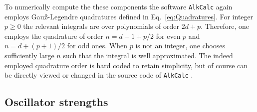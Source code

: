 \documentclass[fontsize=12pt,
               twoside=false,
               BCOR=0mm,
               DIV=14,
               overfullrule=false, %
               toc=bibliography,
               headinclude=true,
               footinclude=false]{scrartcl}
\numberwithin{equation}{section}
\newcommand{\alkcalc}{\texttt{AlkCalc} }
\begin{document}
    To numerically compute the these components the software \alkcalc again
    employs Gau\ss-Legendre quadratures defined in Eq.~\eqref{eq:Quadratures}.
    For integer $p\geq0$ the relevant integrals are over polynomials of order
    $2d+p$. Therefore, one employs the quadrature of order $n=d+1+p\slash{2}$
    for even $p$ and $n=d+(p+1)\slash{2}$ for odd ones. When $p$ is not an
    integer, one chooses sufficiently large $n$ such that the integral is well
    approximated.  The indeed employed quadrature order is hard coded to retain
    simplicity, but of course can be directly viewed or changed in the source
    code of \alkcalc.

    \subsection{Oscillator strengths}
    \label{subsec:OscillatorStrengths}
\end{document}
